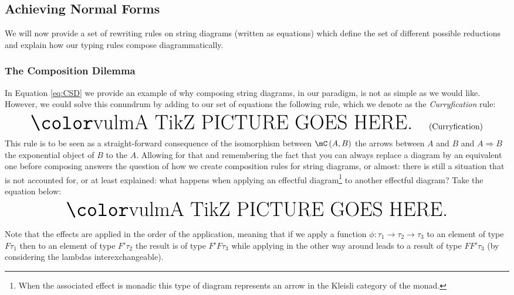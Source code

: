 \documentclass[math, english, info]{cours}
\begin{document}
\subsection{Achieving Normal Forms}
\label{subsec:normalforms}
We will now provide a set of rewriting rules on string diagrams (written as equations) which define the set of different possible reductions and explain how our typing rules compose diagrammatically.

\subsubsection{The Composition Dilemma}
\label{subsubsec:cds}
In Equation \eqref{eq:CSD} we provide an example of why composing string diagrams, in our paradigm, is not as simple as we would like.
However, we could solve this conundrum by adding to our set of equations the following rule, which we denote as the \emph{Curryfication} rule:
\begin{equation}
	\inputtikz{sd-curry}
	\label{eq:curry}\tag{Curryfication}
\end{equation}
This rule is to be seen as a straight-forward consequence of the isomorphism between $\mC\left( A, B\right)$
the arrows between $A$ and $B$ and $A \Rightarrow B$ the exponential object of $B$ to the $A$.
Allowing for that and remembering the fact that you can always replace a diagram by an equivalent one
before composing answers the question of how we create composition rules for string diagrams, or almost:
there is still a situation that is not accounted for, or at least explained:
what happens when applying an effectful diagram\footnote{When the associated effect is monadic this
	type of diagram represents an arrow in the Kleisli category of the monad.} to another effectful diagram?
Take the equation below:
\begin{equation*}
	\inputtikz{sd-kleisli-composition}
\end{equation*}

Note that the effects are applied in the order of the application, meaning that if we apply a function
$\phi: \tau_{1} \to \tau_{2} \to \tau_{3}$ to an element of type $F\tau_{1}$ then to an element of
type $F'\tau_{2}$ the result is of type $F'F\tau_{3}$ while applying in the other way around leads to
a result of type $FF'\tau_{3}$ (by considering the lambdas interexchangeable).
\end{document}
